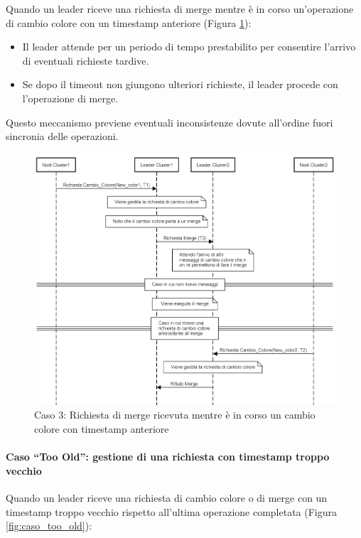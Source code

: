 \documentclass[12pt, a4paper]{report}
\begin{document}
Quando un leader riceve una richiesta di merge mentre \`e in corso un'operazione di cambio colore con un timestamp anteriore (Figura \ref{fig:caso3_concorrenza}):

\begin{itemize}
    \item Il leader attende per un periodo di tempo prestabilito per consentire l'arrivo di eventuali richieste tardive.
    \item Se dopo il timeout non giungono ulteriori richieste, il leader procede con l'operazione di merge.
\end{itemize}

Questo meccanismo previene eventuali inconsistenze dovute all'ordine fuori sincronia delle operazioni.

\begin{figure}[H]
    \centering
    \includegraphics[width=1\textwidth,align=t]{images/concorrenza/caso3.png}
    \caption{Caso 3: Richiesta di merge ricevuta mentre \`e in corso un cambio colore con timestamp anteriore}
    \label{fig:caso3_concorrenza}
\end{figure}

\newpage
\paragraph{Caso ``Too Old'': gestione di una richiesta con timestamp troppo vecchio}\label{par:too_old}

Quando un leader riceve una richiesta di cambio colore o di merge con un timestamp troppo vecchio rispetto all'ultima operazione completata (Figura \ref{fig:caso_too_old}):
\end{document}
